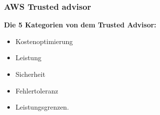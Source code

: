 \subsubsection{AWS Trusted advisor}

  \textbf{Die 5 Kategorien von dem Trusted Advisor:}
  
  \begin{itemize}
    \item
    Kostenoptimierung

    \item
    Leistung
    \item
    Sicherheit 
    \item
    Fehlertoleranz
    \item
    Leistungsgrenzen.
  \end{itemize}\textbf{}




